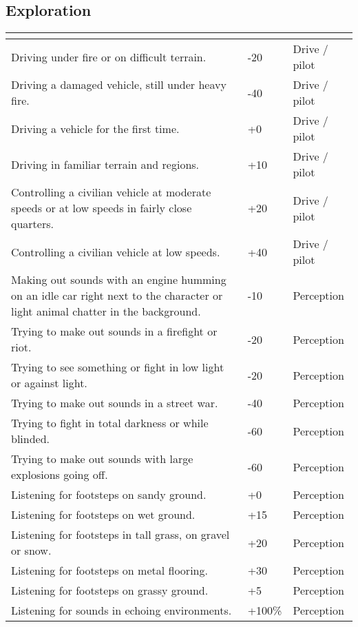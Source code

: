 \documentclass[12pt,a4paper,openany]{book}
\newcommand{\ul}[1]{\underline{\smash{#1}}}
\begin{document}
	\subsection{Exploration}
	\begin{tabularx}{\textwidth}{|X|l|l|}
		\hline
		\ul{Situation} & \ul{Modifier} & \ul{Focused skill} \\ \hline
		Driving under fire or on difficult terrain. & -20 & Drive / pilot \\ \hline
		Driving a damaged vehicle, still under heavy fire. & -40 & Drive / pilot \\ \hline
		Driving a vehicle for the first time. & +0 & Drive / pilot \\ \hline
		Driving in familiar terrain and regions. & +10 & Drive / pilot \\ \hline
		Controlling a civilian vehicle at moderate speeds or at low speeds in fairly close quarters. & +20 & Drive / pilot \\ \hline
		Controlling a civilian vehicle at low speeds. & +40 & Drive / pilot \\ \hline
		Making out sounds with an engine humming on an idle car right next to the character or light animal chatter in the background. & -10 & Perception \\ \hline
		Trying to make out sounds in a firefight or riot. & -20 & Perception \\ \hline
		Trying to see something or fight in low light or against light. & -20 & Perception \\ \hline
		Trying to make out sounds in a street war. & -40 & Perception \\ \hline
		Trying to fight in total darkness or while blinded. & -60 & Perception \\ \hline
		Trying to make out sounds with large explosions going off. & -60 & Perception \\ \hline
		Listening for footsteps on sandy ground. & +0 & Perception \\ \hline
		Listening for footsteps on wet ground. & +15 & Perception \\ \hline
		Listening for footsteps in tall grass, on gravel or snow. & +20 & Perception \\ \hline
		Listening for footsteps on metal flooring. & +30 & Perception \\ \hline
		Listening for footsteps on grassy ground. & +5 & Perception \\ \hline
		Listening for sounds in echoing environments. & +100\% & Perception \\ \hline

\end{tabularx}
\end{document}
